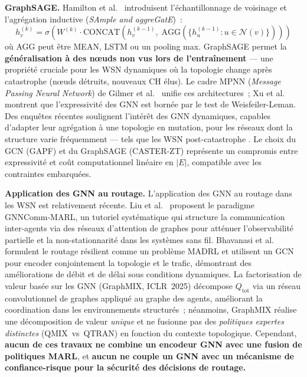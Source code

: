 \textbf{GraphSAGE.} Hamilton et al.\ \cite{hamilton2017graphsage} introduisent l'échantillonnage de voisinage et l'agrégation inductive (\emph{SAmple and aggreGatE})~:
\begin{equation}
    h_v^{(k)} = \sigma\!\left(W^{(k)} \cdot \text{CONCAT}\!\left(h_v^{(k-1)},\; \text{AGG}\!\left(\{h_u^{(k-1)} : u \in \mathcal{N}(v)\}\right)\right)\right)
\end{equation}
où AGG peut être MEAN, LSTM ou un pooling max. GraphSAGE permet la \textbf{généralisation à des n\oe{}uds non vus lors de l'entraînement} --- une propriété cruciale pour les WSN dynamiques où la topologie change après catastrophe (n\oe{}uds détruits, nouveaux CH élus). Le cadre MPNN (\emph{Message Passing Neural Network}) de Gilmer et al.\ \cite{gilmer2017mpnn} unifie ces architectures~; Xu et al.\ \cite{xu2019gin} montrent que l'expressivité des GNN est bornée par le test de Weisfeiler-Leman. Des enquêtes récentes soulignent l'intérêt des GNN dynamiques, capables d'adapter leur agrégation à une topologie en mutation, pour les réseaux dont la structure varie fréquemment --- tels que les WSN post-catastrophe \cite{dynamic_gnn_tkde2026}. Le choix du GCN (GAPF) et du GraphSAGE (CASTER-ZT) représente un compromis entre expressivité et coût computationnel linéaire en $|E|$, compatible avec les contraintes embarquées.

\textbf{Application des GNN au routage.} L'application des GNN au routage dans les WSN est relativement récente. Liu et al.\ \cite{liu2024gnncomm} proposent le paradigme GNNComm-MARL, un tutoriel systématique qui structure la communication inter-agents via des réseaux d'attention de graphes pour atténuer l'observabilité partielle et la non-stationnarité dans les systèmes sans fil. Bhavanasi et al.\ \cite{bhavanasi2023resilient} formulent le routage résilient comme un problème MADRL et utilisent un GCN pour encoder conjointement la topologie et le trafic, démontrant des améliorations de débit et de délai sous conditions dynamiques. La factorisation de valeur basée sur les GNN (GraphMIX, ICLR~2025) \cite{graphmix_iclr2025} décompose $Q_{\text{tot}}$ via un réseau convolutionnel de graphes appliqué au graphe des agents, améliorant la coordination dans les environnements structurés~; néanmoins, GraphMIX réalise une décomposition de valeur \emph{unique} et ne fusionne pas des \emph{politiques expertes distinctes} (QMIX~vs~QTRAN) en fonction du contexte topologique. Cependant, \textbf{aucun de ces travaux ne combine un encodeur GNN avec une fusion de politiques MARL}, et \textbf{aucun ne couple un GNN avec un mécanisme de confiance-risque pour la sécurité des décisions de routage.}


